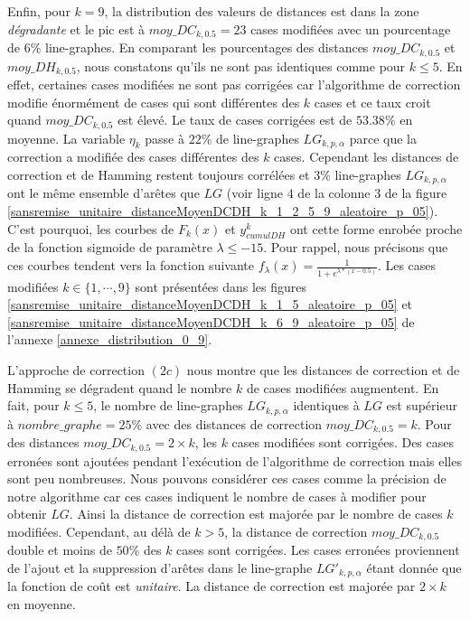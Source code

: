 Enfin, pour $k=9$, la distribution des valeurs de distances est dans la zone {\em d\'egradante} et le pic est \`a $moy\_DC_{k,0.5} = 23$ cases modifi\'ees avec un pourcentage de $6\%$ line-graphes.  
En comparant les pourcentages des distances $moy\_DC_{k,0.5}$ et $moy\_DH_{k,0.5}$, nous constatons qu'ils ne sont pas identiques comme pour $k \le 5$. En effet, certaines cases modifi\'ees ne sont pas corrig\'ees car l'algorithme de correction modifie \'enorm\'ement de cases qui sont diff\'erentes des $k$ cases et ce taux croit quand  $moy\_DC_{k,0.5}$ est \'elev\'e. 
Le taux de cases corrig\'ees est de $53.38\%$ en moyenne.
La variable $\eta_k$ passe \`a $22\%$ de line-graphes $LG_{k,p,\alpha}$ parce que la correction a modifi\'ee des cases diff\'erentes des $k$ cases. Cependant les distances de correction et de Hamming restent toujours corr\'el\'ees et $3\%$ line-graphes $LG_{k,p,\alpha}$ ont le m\^eme ensemble d'ar\^etes que $LG$ (voir ligne $4$ de la colonne $3$ de la figure \ref{sansremise_unitaire_distanceMoyenDCDH_k_1_2_5_9_aleatoire_p_05}).
C'est pourquoi, les courbes de  $F_k(x)$ et $y_{cumulDH}^{k}$ ont cette forme enrob\'ee proche de la fonction  sigmoide de param\`etre $\lambda \le -15$. Pour rappel, nous pr\'ecisons que ces courbes  tendent vers la fonction suivante $f_{\lambda}(x) = \frac{1}{1+e^{\lambda * (x-0.5)}}$.
\newline
Les  cases modifi\'ees $k \in \{1,\cdots,9\}$ sont pr\'esent\'ees dans les figures 
 \ref{sansremise_unitaire_distanceMoyenDCDH_k_1_5_aleatoire_p_05} et  
\ref{sansremise_unitaire_distanceMoyenDCDH_k_6_9_aleatoire_p_05} de l'annexe \ref{annexe_distribution_0_9}.
\newline

L'approche de correction $(2c)$ nous montre que les distances de correction et de Hamming se d\'egradent quand le nombre $k$ de cases modifi\'ees augmentent. En fait, pour $k \le 5$, le nombre de line-graphes $LG_{k,p,\alpha}$ identiques \`a $LG$ est sup\'erieur \`a $nombre\_graphe = 25\%$ avec des distances de correction $moy\_DC_{k,0.5} = k$. Pour des distances $moy\_DC_{k,0.5} = 2 \times k$, les  $k$ cases modifi\'ees sont corrig\'ees. 
Des cases erron\'ees sont ajout\'ees pendant l'ex\'ecution de l'algorithme de correction mais elles sont peu nombreuses. Nous pouvons consid\'erer ces cases comme la pr\'ecision de notre algorithme  car ces cases indiquent le nombre de cases \`a modifier pour obtenir $LG$. Ainsi la distance de correction est major\'ee par le nombre de cases $k$ modifi\'ees.
Cependant, au d\'el\`a de $k > 5$,  la distance de correction $moy\_DC_{k,0.5}$ double et moins de $50\%$ des $k$ cases sont corrig\'ees. Les cases erron\'ees proviennent de l'ajout et la suppression d'ar\^etes dans le line-graphe $LG'_{k,p,\alpha}$ \'etant donn\'ee que la fonction de co\^ut est {\em unitaire}. La distance de correction est major\'ee par $2 \times k$ en moyenne.
\newline

